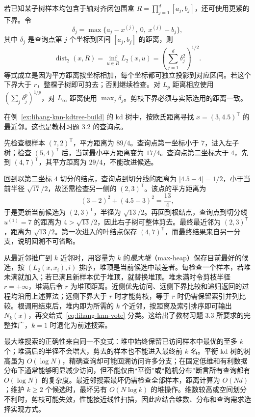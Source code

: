 若已知某子树样本均包含于轴对齐闭包围盒 $R=\prod_{j=1}^{d}[a_j,b_j]$，还可使用更紧的下界。令
\[
  \delta_j=\max\{a_j-x^{(j)},\ 0,\ x^{(j)}-b_j\},
\]
其中 $\delta_j$ 是查询点第 $j$ 个坐标到区间 $[a_j,b_j]$ 的距离，则
\begin{equation}
  \operatorname{dist}_2(x,R)
  =\inf_{u\in R}L_2(x,u)
  =\left(\sum_{j=1}^{d}\delta_j^2\right)^{1/2}.
  \label{eq:lihang-knn-box-bound}
\end{equation}
等式成立是因为平方距离按坐标相加，每个坐标都可独立投影到对应区间。若这个下界大于 $r$，整棵子树即可剪去；否则继续检查。对 $L_p$ 距离相应使用 $(\sum_j\delta_j^p)^{1/p}$，对 $L_\infty$ 距离使用 $\max_j\delta_j$。剪枝下界必须与实际选用的距离一致。

\begin{example}
\label{ex:lihang-knn-kdtree-query}
在例~\ref{ex:lihang-knn-kdtree-build} 的 kd 树中，按欧氏距离寻找 $x=(3,4.5)^\mathsf T$ 的最近邻。这也是教材习题 3.2 的查询点。
\end{example}
\begin{solve}
先检查根样本 $(7,2)^\mathsf T$，平方距离为 $89/4$。查询点第一坐标小于 $7$，进入左子树；检查 $(5,4)^\mathsf T$ 后，当前最小平方距离变为 $17/4$。查询点第二坐标大于 $4$，先到 $(4,7)^\mathsf T$，其平方距离为 $29/4$，不能改进候选。

回到以第二坐标 $4$ 切分的结点，查询点到切分线的距离为 $|4.5-4|=1/2$，小于当前半径 $\sqrt{17}/2$，故还需检查另一侧的 $(2,3)^\mathsf T$。该点的平方距离为
\[
  (3-2)^2+(4.5-3)^2=\frac{13}{4},
\]
于是更新当前候选为 $(2,3)^\mathsf T$，半径为 $\sqrt{13}/2$。再回到根结点，查询点到切分线 $u^{(1)}=7$ 的距离为 $4>\sqrt{13}/2$，因此右子树可整体剪去。最终最近邻为 $(2,3)^\mathsf T$，距离为 $\sqrt{13}/2$。第一次进入的叶结点保存 $(4,7)^\mathsf T$，而最终结果来自另一分支，说明回溯不可省略。
\end{solve}

从最近邻推广到 $k$ 近邻时，用容量为 $k$ 的\emph{最大堆}（max-heap）保存目前最好的候选，按 $(L_2(x,x_i),i)$ 排序，堆顶是当前候选中最差者。每检查一个样本，若堆未满就加入；若已满且新样本优于堆顶，就替换堆顶。堆未满时令剪枝半径 $r=+\infty$，堆满后令 $r$ 为堆顶距离。近侧优先访问、远侧下界比较和递归返回的过程均沿用上述算法；远侧下界大于 $r$ 时才能剪枝，等于 $r$ 时仍需保留索引并列比较。根调用结束后，堆内即为所需的 $k$ 个近邻，按距离及索引排序即可输出 $N_k(x)$，再交给式~\eqref{eq:lihang-knn-vote} 分类。这给出了教材习题 3.3 所要求的完整推广，$k=1$ 时退化为前述搜索。

最大堆搜索的正确性来自同一不变式：堆中始终保留已访问样本中最优的至多 $k$ 个；堆满后的半径不会增大，剪去的样本也不能进入最终前 $k$ 名。平衡 kd 树的树高虽为 $O(\log N)$，精确查询却可能回溯访问许多分支；在固定低维和有利数据分布下通常能够明显减少访问，但不能仅由“平衡”或“随机分布”断言所有查询都有 $O(\log N)$ 的复杂度。最近邻搜索最坏仍需检查全部样本，距离计算为 $O(Nd)$；维护 $k\geq2$ 个候选时，最坏另有 $O(N\log k)$ 的堆操作。维数较高或空间划分不利时，剪枝可能失效，性能接近线性扫描，因此应结合维数、分布和查询需求选择实现方式。

